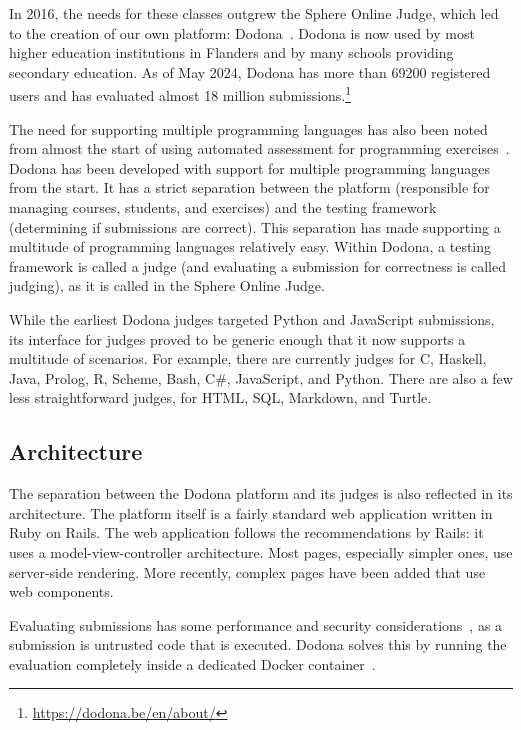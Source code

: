 \documentclass[../main]{subfiles}
\begin{document}
In 2016, the needs for these classes outgrew the Sphere Online Judge, which led to the creation of our own platform: Dodona~\autocite{vanpetegemDodonaLearnCode2023}.
Dodona is now used by most higher education institutions in Flanders and by many schools providing secondary education.
As of May 2024, Dodona has more than \num{69200} registered users and has evaluated almost 18 million submissions.\footnote{\url{https://dodona.be/en/about/}}

The need for supporting multiple programming languages has also been noted from almost the start of using automated assessment for programming exercises~\autocite{hextAutomaticGradingScheme1969}.
Dodona has been developed with support for multiple programming languages from the start.
It has a strict separation between the platform (responsible for managing courses, students, and exercises) and the testing framework (determining if submissions are correct).
This separation has made supporting a multitude of programming languages relatively easy.
Within Dodona, a testing framework is called a judge (and evaluating a submission for correctness is called judging), as it is called in the Sphere Online Judge.

While the earliest Dodona judges targeted Python and JavaScript submissions, its interface for judges proved to be generic enough that it now supports a multitude of scenarios.
For example, there are currently judges for C, Haskell, Java, Prolog, R, Scheme, Bash, C\#, JavaScript, and Python.
There are also a few less straightforward judges, for HTML, SQL, Markdown, and Turtle.

\subsection{Architecture}\label{subsec:architecture}

The separation between the Dodona platform and its judges is also reflected in its architecture.
The platform itself is a fairly standard web application written in Ruby on Rails.
The web application follows the recommendations by Rails: it uses a model-view-controller architecture.
Most pages, especially simpler ones, use server-side rendering.
More recently, complex pages have been added that use web components.

Evaluating submissions has some performance and security considerations~\autocite{wasikSurveyOnlineJudge2018}, as a submission is untrusted code that is executed.
Dodona solves this by running the evaluation completely inside a dedicated Docker container~\autocite{pevelerComparingJailedSandboxes2019}.
\end{document}
